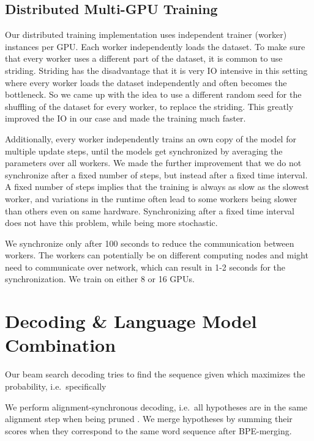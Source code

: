 \documentclass[a4paper]{article}
\begin{document}
\subsection{Distributed Multi-GPU Training}

Our distributed training implementation
uses independent trainer (worker) instances per GPU.
Each worker independently loads the dataset.
To make sure that every worker uses a different part of the dataset,
it is common to use striding.
Striding has the disadvantage that it is very IO intensive
in this setting where every worker loads the dataset independently
and often becomes the bottleneck.
So we came up with the idea to use a different random seed
for the shuffling of the dataset for every worker,
to replace the striding.
This greatly improved the IO in our case
and made the training much faster.

Additionally, every worker independently trains an own copy of the model
for multiple update steps, until the models get synchronized
by averaging the parameters over all workers.
We made the further improvement that we do not synchronize
after a fixed number of steps,
but instead after a fixed time interval.
A fixed number of steps implies that the training is always as slow
as the slowest worker,
and variations in the runtime often lead to some workers
being slower than others even on same hardware.
Synchronizing after a fixed time interval does not have this problem,
while being more stochastic.

We synchronize only after 100 seconds
to reduce the communication between workers.
The workers can potentially be on different computing nodes
and might need to communicate over network,
which can result in 1-2 seconds for the synchronization.
We train on either 8 or 16 GPUs.


\section{Decoding \& Language Model Combination}

Our beam search decoding tries to find the sequence 
given  which maximizes the probability,
i.e.~specifically

We perform alignment-synchronous decoding,
i.e.~all hypotheses are in the same alignment step 
when being pruned \cite{zeyer2020:transducer,saon2020rnnt}.
We merge hypotheses by summing their scores
when they correspond to the same word sequence after BPE-merging.
\end{document}
